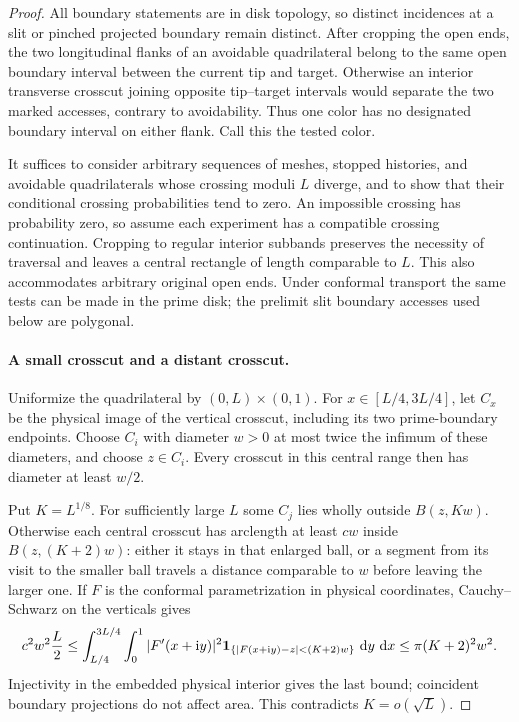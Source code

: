 \begin{proof}
All boundary statements are in disk topology, so distinct incidences
at a slit or pinched projected boundary remain distinct.  After
cropping the open ends, the two longitudinal flanks of an avoidable
quadrilateral belong to the same open boundary interval between
the current tip and target.  Otherwise an interior transverse
crosscut joining opposite tip--target intervals would separate
the two marked accesses, contrary to avoidability.  Thus one color
has no designated boundary interval on either flank.  Call this
the tested color.

It suffices to consider arbitrary sequences of meshes, stopped
histories, and avoidable quadrilaterals whose crossing moduli $L$
diverge, and to show that their conditional crossing probabilities
tend to zero.  An impossible crossing has probability zero, so
assume each experiment has a compatible crossing continuation.
Cropping to regular interior subbands preserves the necessity of
traversal and leaves a central rectangle of length comparable to
$L$.  This also accommodates arbitrary original open ends.  Under
conformal transport the same tests can be made in the prime disk;
the prelimit slit boundary accesses used below are polygonal.

\paragraph{A small crosscut and a distant crosscut.}
Uniformize the quadrilateral by $(0,L)\times(0,1)$.  For
$x\in[L/4,3L/4]$, let $C_x$ be the physical image of the vertical
crosscut, including its two prime-boundary endpoints.  Choose $C_i$
with diameter $w>0$ at most twice the infimum of these diameters,
and choose $z\in C_i$.  Every crosscut in this central range then
has diameter at least $w/2$.

Put $K=L^{1/8}$.  For sufficiently large $L$ some $C_j$ lies
wholly outside $B(z,Kw)$.  Otherwise each central crosscut has
arclength at least $cw$ inside $B(z,(K+2)w)$: either it stays in
that enlarged ball, or a segment from its visit to the smaller
ball travels a distance comparable to $w$ before leaving the
larger one.  If $F$ is the conformal parametrization in physical
coordinates, Cauchy--Schwarz on the verticals gives
\[
 c^2w^2\frac L2
 \le \int_{L/4}^{3L/4}\int_0^1
 |F'(x+\mathrm i y)|^2
 \mathbf 1_{\{|F(x+\mathrm i y)-z|<(K+2)w\}}\,\,\mathrm d y\,\,\mathrm d x
 \le \pi(K+2)^2w^2.
\]
Injectivity in the embedded physical interior gives the last bound;
coincident boundary projections do not affect area.  This
contradicts $K=o(\sqrt L)$.


\end{proof}

